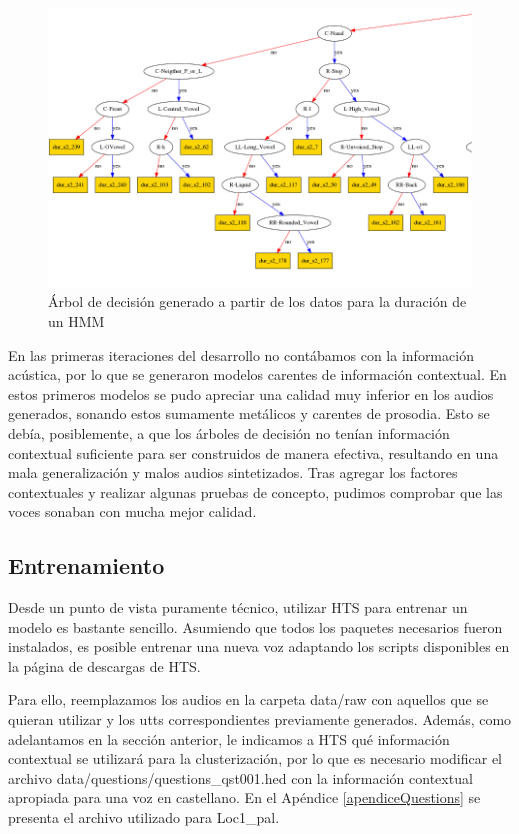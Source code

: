 \begin{figure}
\begin{center}
\includegraphics[scale=0.4]{imagenes/arbolDeDesicionTesis.png}
\caption{Árbol de decisión generado a partir de los datos para la duración de un HMM}
\label{genTree}
\end{center}
\end{figure}

En las primeras iteraciones del desarrollo no contábamos con la información acústica, por lo que se generaron modelos carentes de información contextual. En estos primeros modelos se pudo apreciar una calidad muy inferior en los audios generados, sonando estos sumamente metálicos y carentes de prosodia. Esto se debía, posiblemente, a que los árboles de decisión no tenían información contextual suficiente para ser construidos de manera efectiva, resultando en una mala generalización y malos audios sintetizados. Tras agregar los factores contextuales y realizar algunas pruebas de concepto, pudimos comprobar que las voces sonaban con mucha mejor calidad.


\subsection{Entrenamiento} \label{entrenamientoHTS}

Desde un punto de vista puramente técnico, utilizar HTS para entrenar un modelo es bastante sencillo. Asumiendo que todos los paquetes necesarios fueron instalados, es posible entrenar una nueva voz adaptando los scripts disponibles en la página de descargas de HTS.

Para ello, reemplazamos los audios en la carpeta data/raw con aquellos que se quieran utilizar y los utts correspondientes previamente generados. Además, como adelantamos en la sección anterior, le indicamos a HTS qué información contextual se utilizará para la clusterización, por lo que es necesario modificar el archivo data/questions/questions\_qst001.hed con la información contextual apropiada para una voz en castellano. En el Apéndice \ref{apendiceQuestions} se presenta el archivo utilizado para Loc1\_pal.

